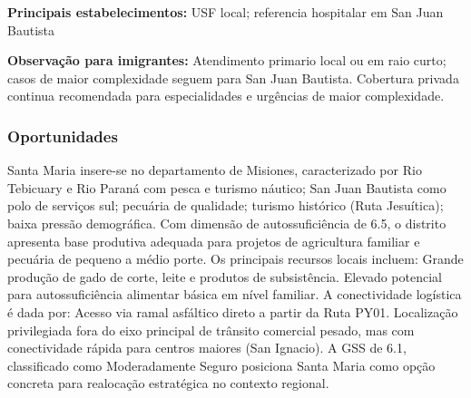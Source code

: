 \textbf{Principais estabelecimentos:} USF local; referencia hospitalar
em San Juan Bautista

\textbf{Observação para imigrantes:} Atendimento primario local ou em
raio curto; casos de maior complexidade seguem para San Juan Bautista.
Cobertura privada continua recomendada para especialidades e urgências
de maior complexidade.
\newpage

\subsubsection*{Oportunidades}\label{oport-santa-maria-0806}
Santa Maria insere-se no departamento de Misiones, caracterizado por Rio Tebicuary e Rio Paraná com pesca e turismo náutico; San Juan Bautista como polo de serviços sul; pecuária de qualidade; turismo histórico (Ruta Jesuítica); baixa pressão demográfica. Com dimensão de autossuficiência de 6.5, o distrito apresenta base produtiva adequada para projetos de agricultura familiar e pecuária de pequeno a médio porte. Os principais recursos locais incluem: Grande produção de gado de corte, leite e produtos de subsistência. Elevado potencial para autossuficiência alimentar básica em nível familiar. A conectividade logística é dada por: Acesso via ramal asfáltico direto a partir da Ruta PY01. Localização privilegiada fora do eixo principal de trânsito comercial pesado, mas com conectividade rápida para centros maiores (San Ignacio). A GSS de 6.1, classificado como Moderadamente Seguro posiciona Santa Maria como opção concreta para realocação estratégica no contexto regional.

